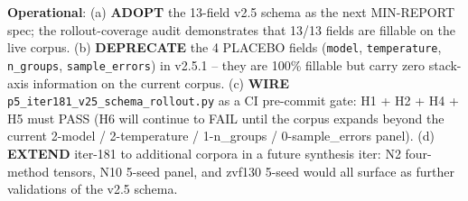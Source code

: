 \noindent\textbf{Operational}: (a) \textbf{ADOPT} the 13-field v2.5
schema as the next MIN-REPORT spec; the rollout-coverage audit
demonstrates that 13/13 fields are fillable on the live corpus.
(b) \textbf{DEPRECATE} the 4 PLACEBO fields (\texttt{model},
\texttt{temperature}, \texttt{n\_groups}, \texttt{sample\_errors})
in v2.5.1 -- they are 100\% fillable but carry zero stack-axis
information on the current corpus. (c) \textbf{WIRE}
\texttt{p5\_iter181\_v25\_schema\_rollout.py} as a CI pre-commit gate:
H1 + H2 + H4 + H5 must PASS (H6 will continue to FAIL until the corpus
expands beyond the current 2-model / 2-temperature / 1-n_groups /
0-sample_errors panel). (d) \textbf{EXTEND} iter-181 to additional
corpora in a future synthesis iter: N2 four-method tensors, N10 5-seed
panel, and zvf130 5-seed would all surface as further validations of
the v2.5 schema.